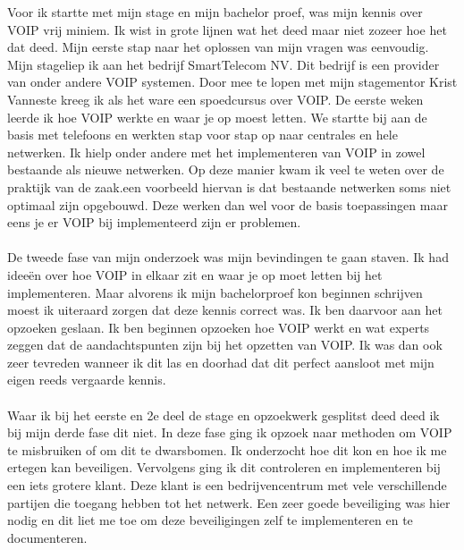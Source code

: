 \documentclass[pdftex,a4paper,12pt,twoside]{report}
\begin{document}
Voor ik startte met mijn stage en mijn bachelor proef, was mijn kennis over VOIP vrij miniem. Ik wist in grote lijnen wat het deed maar niet zozeer hoe het dat deed. Mijn eerste stap naar het oplossen van mijn vragen was eenvoudig. Mijn stageliep ik aan het bedrijf SmartTelecom NV. Dit bedrijf is een provider van onder andere VOIP systemen. Door mee te lopen met mijn stagementor Krist Vanneste kreeg ik als het ware een spoedcursus over VOIP. De eerste weken leerde ik hoe VOIP werkte en waar je op moest letten. We startte bij aan de basis met telefoons en werkten stap voor stap op naar centrales en hele netwerken. Ik hielp onder andere met het implementeren van VOIP in zowel bestaande als nieuwe netwerken. Op deze manier kwam ik veel te weten over de praktijk van de zaak.een voorbeeld hiervan is dat bestaande netwerken soms niet optimaal zijn opgebouwd. Deze werken dan wel voor de basis toepassingen maar eens je er VOIP bij implementeerd zijn er problemen. 
\\ \\
De tweede fase van mijn onderzoek was mijn bevindingen te gaan staven. Ik had ideeën over hoe VOIP in elkaar zit en waar je op moet letten bij het implementeren. Maar alvorens ik mijn bachelorproef kon beginnen schrijven moest ik uiteraard zorgen dat deze kennis correct was. Ik ben daarvoor aan het opzoeken geslaan. Ik ben beginnen opzoeken hoe VOIP werkt en wat experts zeggen dat de aandachtspunten zijn bij het opzetten van VOIP. Ik was dan ook zeer tevreden wanneer ik dit las en doorhad dat dit perfect aansloot met mijn eigen reeds vergaarde kennis.
\\ \\
Waar ik bij het eerste en 2e deel de stage en opzoekwerk gesplitst deed deed ik bij mijn derde fase dit niet. In deze fase ging ik opzoek naar methoden om VOIP te misbruiken of om dit te dwarsbomen. Ik onderzocht hoe dit kon en hoe ik me ertegen kan beveiligen. Vervolgens ging ik dit controleren en implementeren bij een iets grotere klant. Deze klant is een bedrijvencentrum met vele verschillende partijen die toegang hebben tot het netwerk. Een zeer goede beveiliging was hier nodig en dit liet me toe om deze beveiligingen zelf te implementeren en te documenteren.
\newpage



\end{document}
